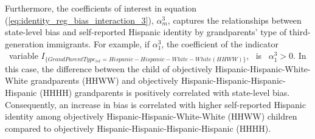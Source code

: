 \documentclass[12pt, fullpage]{article}
\begin{document}
Furthermore, the coefficients of interest in equation (\ref{eq:identity_reg_bias_interaction_3}), $\alpha_m^3$, captures the relationships between state-level bias and self-reported Hispanic identity by grandparents' type of third-generation immigrants. For example, if $\alpha_1^3$, the coefficient of the indicator ~variable \newline $I_{\{GrandParentType_{ist} = Hispanic-Hispanic-White-White (HHWW)\}}$, ~is ~$\alpha_1^3 > 0$. In this case, the difference between the child of objectively Hispanic-Hispanic-White-White grandparents (HHWW) and objectively Hispanic-Hispanic-Hispanic-Hispanic (HHHH) grandparents is positively correlated with state-level bias. Consequently, an increase in bias is correlated with higher self-reported Hispanic identity among objectively Hispanic-Hispanic-White-White (HHWW) children compared to objectively Hispanic-Hispanic-Hispanic-Hispanic (HHHH). 
\end{document}
